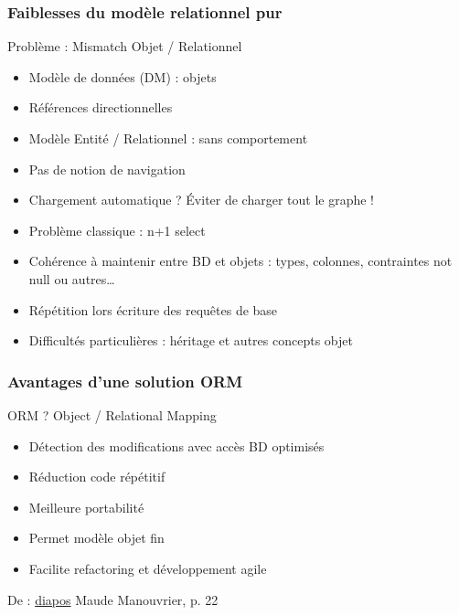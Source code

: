 \documentclass[english, french]{beamer}
\begin{document}
\begin{frame}
	\frametitle{Faiblesses du modèle relationnel pur}
	Problème : \og{}Mismatch\fg{} Objet / Relationnel
	\begin{itemize}
		\item Modèle de données (DM) : objets
		\item Références directionnelles
		\item Modèle Entité / Relationnel : sans comportement
		\item Pas de notion de navigation
		\item Chargement automatique ? \pause Éviter de charger tout le graphe !\pause
		\item Problème classique : n+1 select
		\item Cohérence à maintenir entre BD et objets : types, colonnes, contraintes not null ou autres…
		\item Répétition lors écriture des requêtes de base
		\item Difficultés particulières : héritage et autres concepts objet
	\end{itemize}
\end{frame}

\begin{frame}
	\frametitle{Avantages d’une solution ORM}
	ORM ? \pause Object / Relational Mapping \pause
	\begin{itemize}
		\item Détection des modifications avec accès BD optimisés
		\item Réduction code répétitif
		\item Meilleure portabilité
		\item Permet modèle objet fin
		\item Facilite refactoring et développement agile
	\end{itemize}
	{\tiny De : \href{http://www.lamsade.dauphine.fr/~manouvri/HIBERNATE/SLIDES/ORM.pdf}{diapos} Maude Manouvrier, p. 22}
\end{frame}
\end{document}
